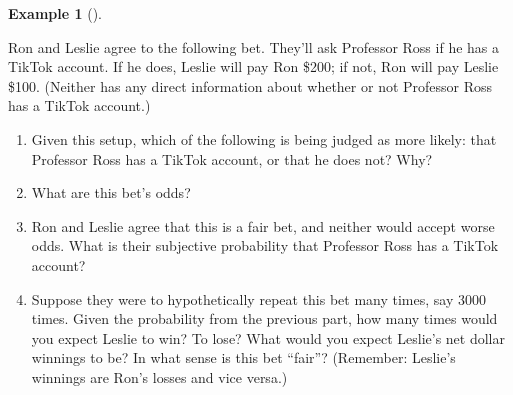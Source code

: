 \documentclass[
  letterpaper,
  DIV=11,
  numbers=noendperiod]{scrreprt}
\providecommand{\tightlist}{%
  \setlength{\itemsep}{0pt}\setlength{\parskip}{0pt}}
\theoremstyle{plain}
\theoremstyle{definition}
\newtheorem{example}{Example}[chapter]
\theoremstyle{definition}
\theoremstyle{definition}
\theoremstyle{remark}
\begin{document}
\begin{tcolorbox}[enhanced jigsaw, opacityback=0, left=2mm, colframe=quarto-callout-note-color-frame, toprule=.15mm, breakable, colback=white, leftrule=.75mm, arc=.35mm, rightrule=.15mm, bottomrule=.15mm]

\begin{example}[]\protect\hypertarget{exm-bet-EV}{}\label{exm-bet-EV}

Ron and Leslie agree to the following bet. They'll ask Professor Ross if
he has a TikTok account. If he does, Leslie will pay Ron \$200; if not,
Ron will pay Leslie \$100. (Neither has any direct information about
whether or not Professor Ross has a TikTok account.)

\begin{enumerate}
\def\labelenumi{\arabic{enumi}.}
\tightlist
\item
  Given this setup, which of the following is being judged as more
  likely: that Professor Ross has a TikTok account, or that he does not?
  Why?
\item
  What are this bet's odds?
\item
  Ron and Leslie agree that this is a fair bet, and neither would accept
  worse odds. What is their subjective probability that Professor Ross
  has a TikTok account?
\item
  Suppose they were to hypothetically repeat this bet many times, say
  3000 times. Given the probability from the previous part, how many
  times would you expect Leslie to win? To lose? What would you expect
  Leslie's net dollar winnings to be? In what sense is this bet
  ``fair''? (Remember: Leslie's winnings are Ron's losses and vice
  versa.)
\end{enumerate}

\end{example}

\end{tcolorbox}
\end{document}

